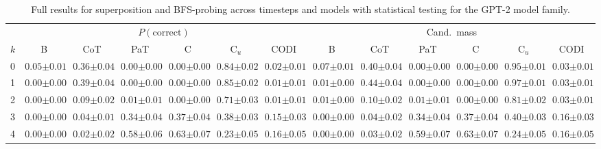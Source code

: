 \begin{table}[!t]
\begin{tabular}{l cccccc cccccc}
\midrule
 & \multicolumn{6}{c}{$P(\text{correct})$} & \multicolumn{6}{c}{Cand.\ mass} \\
\cmidrule(lr){2-7} \cmidrule(lr){8-13}
$k$ & B & CoT & PaT & C & C$_u$ & CODI & B & CoT & PaT & C & C$_u$ & CODI \\
\midrule
0 & $0.05 {\scriptstyle \pm 0.01}$ & $0.36 {\scriptstyle \pm 0.04}$ & $0.00 {\scriptstyle \pm 0.00}$ & $0.00 {\scriptstyle \pm 0.00}$ & $0.84 {\scriptstyle \pm 0.02}$ & $0.02 {\scriptstyle \pm 0.01}$ & $0.07 {\scriptstyle \pm 0.01}$ & $0.40 {\scriptstyle \pm 0.04}$ & $0.00 {\scriptstyle \pm 0.00}$ & $0.00 {\scriptstyle \pm 0.00}$ & $0.95 {\scriptstyle \pm 0.01}$ & $0.03 {\scriptstyle \pm 0.01}$ \\
1 & $0.00 {\scriptstyle \pm 0.00}$ & $0.39 {\scriptstyle \pm 0.04}$ & $0.00 {\scriptstyle \pm 0.00}$ & $0.00 {\scriptstyle \pm 0.00}$ & $0.85 {\scriptstyle \pm 0.02}$ & $0.01 {\scriptstyle \pm 0.01}$ & $0.01 {\scriptstyle \pm 0.00}$ & $0.44 {\scriptstyle \pm 0.04}$ & $0.00 {\scriptstyle \pm 0.00}$ & $0.00 {\scriptstyle \pm 0.00}$ & $0.97 {\scriptstyle \pm 0.01}$ & $0.03 {\scriptstyle \pm 0.01}$ \\
2 & $0.00 {\scriptstyle \pm 0.00}$ & $0.09 {\scriptstyle \pm 0.02}$ & $0.01 {\scriptstyle \pm 0.01}$ & $0.00 {\scriptstyle \pm 0.00}$ & $0.71 {\scriptstyle \pm 0.03}$ & $0.01 {\scriptstyle \pm 0.01}$ & $0.01 {\scriptstyle \pm 0.00}$ & $0.10 {\scriptstyle \pm 0.02}$ & $0.01 {\scriptstyle \pm 0.01}$ & $0.00 {\scriptstyle \pm 0.00}$ & $0.81 {\scriptstyle \pm 0.02}$ & $0.03 {\scriptstyle \pm 0.01}$ \\
3 & $0.00 {\scriptstyle \pm 0.00}$ & $0.04 {\scriptstyle \pm 0.01}$ & $0.34 {\scriptstyle \pm 0.04}$ & $0.37 {\scriptstyle \pm 0.04}$ & $0.38 {\scriptstyle \pm 0.03}$ & $0.15 {\scriptstyle \pm 0.03}$ & $0.00 {\scriptstyle \pm 0.00}$ & $0.04 {\scriptstyle \pm 0.02}$ & $0.34 {\scriptstyle \pm 0.04}$ & $0.37 {\scriptstyle \pm 0.04}$ & $0.40 {\scriptstyle \pm 0.03}$ & $0.16 {\scriptstyle \pm 0.03}$ \\
4 & $0.00 {\scriptstyle \pm 0.00}$ & $0.02 {\scriptstyle \pm 0.02}$ & $0.58 {\scriptstyle \pm 0.06}$ & $0.63 {\scriptstyle \pm 0.07}$ & $0.23 {\scriptstyle \pm 0.05}$ & $0.16 {\scriptstyle \pm 0.05}$ & $0.00 {\scriptstyle \pm 0.00}$ & $0.03 {\scriptstyle \pm 0.02}$ & $0.59 {\scriptstyle \pm 0.07}$ & $0.63 {\scriptstyle \pm 0.07}$ & $0.24 {\scriptstyle \pm 0.05}$ & $0.16 {\scriptstyle \pm 0.05}$ \\
\bottomrule
\end{tabular}
\caption{Full results for superposition and BFS-probing across timesteps and models with statistical testing for the GPT-2 model family.}
\label{tab:appendix_bfs_probing_gpt2}
\end{table}

